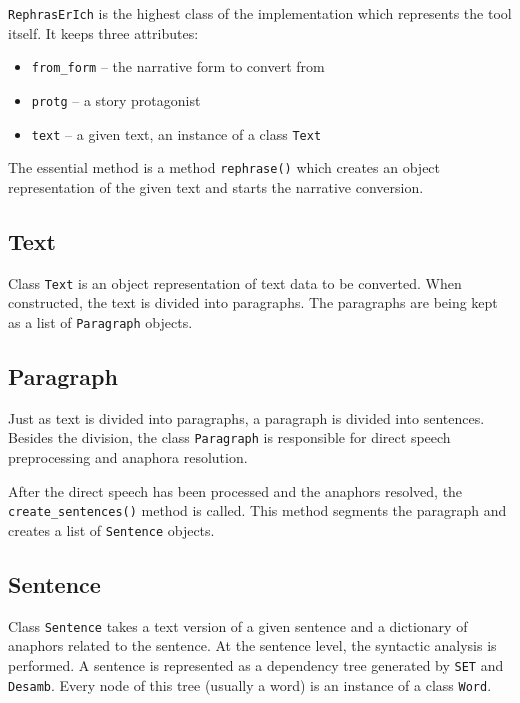 \texttt{RephrasErIch} is the highest class of the implementation which represents the tool itself. It keeps three attributes:

\begin{itemize}
	\item \texttt{from\_form} -- the narrative form to convert from
	\item \texttt{protg} -- a story protagonist
	\item \texttt{text} -- a given text, an instance of a class \texttt{Text}
\end{itemize}

The essential method is a method \texttt{rephrase()} which creates an object representation of the given text and starts the narrative conversion.

\subsection{Text}

Class \texttt{Text} is an object representation of text data to be converted. When constructed, the text is divided into paragraphs. The paragraphs are being kept as a list of \texttt{Paragraph} objects.

\subsection{Paragraph}

Just as text is divided into paragraphs, a paragraph is divided into sentences. Besides the division, the class \texttt{Paragraph} is responsible for direct speech preprocessing and anaphora resolution.

After the direct speech has been processed and the anaphors resolved, the \texttt{create\_sentences()} method is called. This method segments the paragraph and creates a list of \texttt{Sentence} objects.

\subsection{Sentence}

Class \texttt{Sentence} takes a text version of a given sentence and a dictionary of anaphors related to the sentence. At the sentence level, the syntactic analysis is performed. A sentence is represented as a dependency tree generated by \texttt{SET} and \texttt{Desamb}. Every node of this tree (usually a word) is an instance of a class \texttt{Word}.

